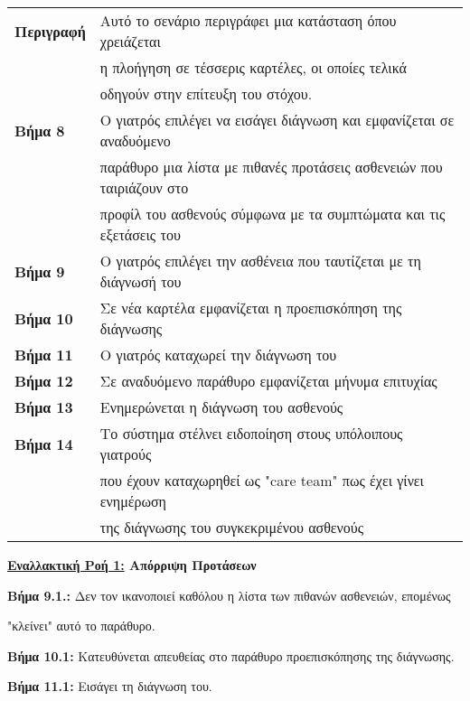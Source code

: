 \documentclass{article}
\newcommand\T{\rule{0pt}{2.6ex}}       %
\newcommand\B{\rule[-1.2ex]{0pt}{0pt}}
\begin{document}
 \begin{center}
     \begin{tabular}{|l|l|}
     \hline
      \textbf{Περιγραφή} & Αυτό το σενάριο περιγράφει μια κατάσταση όπου χρειάζεται \T \\& η πλοήγηση σε τέσσερις καρτέλες, οι οποίες τελικά\\& οδηγούν στην επίτευξη του στόχου. \B \\ 
      \hline
      \textbf{Βήμα 8} & O γιατρός επιλέγει να εισάγει διάγνωση και εμφανίζεται σε αναδυόμενο \T \\& παράθυρο μια λίστα με πιθανές προτάσεις ασθενειών που ταιριάζουν στο \\& προφίλ του ασθενούς σύμφωνα με τα συμπτώματα και τις εξετάσεις του \B \\
      \hline
      \textbf{Βήμα 9} & Ο γιατρός επιλέγει την ασθένεια που ταυτίζεται με τη διάγνωσή του  \T\B \\
      \hline
      \textbf{Βήμα 10} & Σε νέα καρτέλα εμφανίζεται η προεπισκόπηση της διάγνωσης \T\B \\
      \hline
      \textbf{Βήμα 11} & Ο γιατρός καταχωρεί την διάγνωση του \T\B \\
      \hline
      \textbf{Βήμα 12} & Σε αναδυόμενο παράθυρο εμφανίζεται μήνυμα επιτυχίας \T\B \\
      \hline    
      \textbf{Βήμα 13} & Ενημερώνεται η διάγνωση του ασθενούς \T\B \\
      \hline
      \textbf{Βήμα 14} & Το σύστημα στέλνει ειδοποίηση στους υπόλοιπους γιατρούς \T \\& που έχουν καταχωρηθεί ως "care team" πως έχει γίνει ενημέρωση \\& της διάγνωσης του συγκεκριμένου ασθενούς \B \\
      \hline
    \end{tabular}
 \end{center}
 
 \vspace{0.1cm}
\textbf{\underline{Εναλλακτική Ροή 1:} Απόρριψη Προτάσεων}  \vspace{0.2cm}
\par \textbf{Βήμα 9.1.:} Δεν τον ικανοποιεί καθόλου η λίστα των πιθανών ασθενειών, επομένως \par "κλείνει" αυτό το παράθυρο. \vspace{0.1cm}
\par \textbf{Βήμα 10.1:} Κατευθύνεται απευθείας στο παράθυρο προεπισκόπησης της διάγνωσης. \vspace{0.1cm}
\par \textbf{Βήμα 11.1:} Εισάγει τη διάγνωση του. \vspace{0.1cm}
\end{document}
